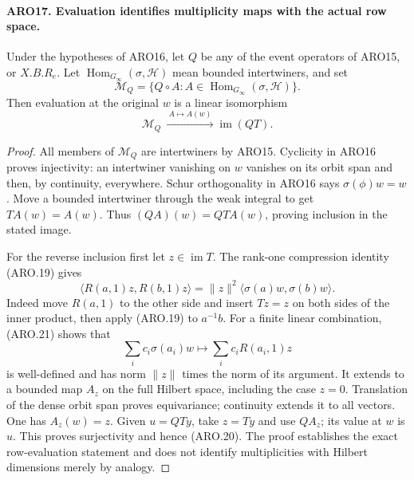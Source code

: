 \documentclass[11pt,a4paper]{article}
\numberwithin{equation}{section}
\theoremstyle{remark}\newtheorem{remark}[theorem]{Remark}
\begin{document}
\paragraph{ARO17. Evaluation identifies multiplicity maps with the actual row space.}
\label{claim:ARO17}
Under the hypotheses of ARO16, let \(Q\) be any of the event
operators of ARO15, or \(X.B.R_e\).  Let
\(\operatorname{Hom}_{G_\infty}(\sigma,\mathcal H)\) mean bounded
intertwiners, and set
\[
 \mathcal M_Q=\{Q\circ A:A\in
                    \operatorname{Hom}_{G_\infty}(\sigma,\mathcal H)\}.
\]
Then evaluation at the original \(w\) is a linear isomorphism
\[
              \mathcal M_Q\ \xrightarrow{\ A\mapsto A(w)\ }
                       \operatorname{im}(QT).        \tag{ARO.20}
\]
\begin{proof}
All members of \(\mathcal M_Q\) are intertwiners by ARO15.
Cyclicity in ARO16 proves injectivity: an intertwiner vanishing on
\(w\) vanishes on its orbit span and then, by continuity, everywhere.
Schur orthogonality in ARO16 says
\(\sigma(\phi)w=w\).  Move a bounded intertwiner through the
weak integral to get \(TA(w)=A(w)\).  Thus
\((Q A)(w)=QT A(w)\), proving inclusion in the stated image.

For the reverse inclusion first let \(z\in\operatorname{im}T\).
The rank-one compression identity (ARO.19) gives
\[
 \langle R(a,1)z,R(b,1)z\rangle
       =\|z\|^2\langle\sigma(a)w,\sigma(b)w\rangle.
 \tag{ARO.21}
\]
Indeed move \(R(a,1)\) to the other side and insert \(Tz=z\)
on both sides of the inner product, then apply (ARO.19) to
\(a^{-1}b\).  For a finite linear combination, (ARO.21) shows that
\[
 \sum_i c_i\sigma(a_i)w\longmapsto
                         \sum_i c_iR(a_i,1)z
\]
is well-defined and has norm \(\|z\|\) times the norm of its
argument.  It extends to a bounded map \(A_z\) on the full Hilbert
space, including the case \(z=0\).  Translation of the dense orbit
span proves equivariance; continuity extends it to all vectors.
One has \(A_z(w)=z\).  Given \(u=QT y\), take \(z=Ty\) and
use \(Q A_z\); its value at \(w\) is \(u\).  This proves
surjectivity and hence (ARO.20).  The proof establishes the exact
row-evaluation statement and does not identify multiplicities with
Hilbert dimensions merely by analogy.
\end{proof}

\end{document}
